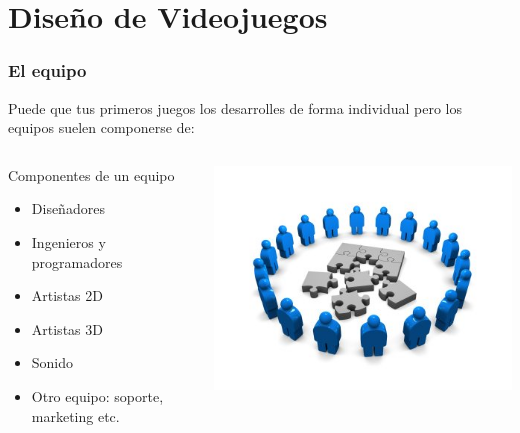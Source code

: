 \documentclass{beamer}
\begin{document}

\section{Diseño de Videojuegos}

\begin{frame}
	\frametitle{El equipo}
	
	Puede que tus primeros juegos los desarrolles de forma individual
	pero los equipos suelen componerse de:
		
	\begin{columns}[c]
	\column{200pt}	
	
	\begin{block}{Componentes de un equipo}
		\begin{itemize}
			\item Diseñadores
			\item Ingenieros y programadores
			\item Artistas 2D
			\item Artistas 3D
			\item Sonido
			\item Otro equipo: soporte, marketing etc.
		\end{itemize}            
	\end{block}
	
	\column{100pt}
	\begin{center}
	    \includegraphics[scale=0.3]{img/collaborate.jpg}
	\end{center}
	
	
	\end{columns}
\end{frame}
\end{document}
